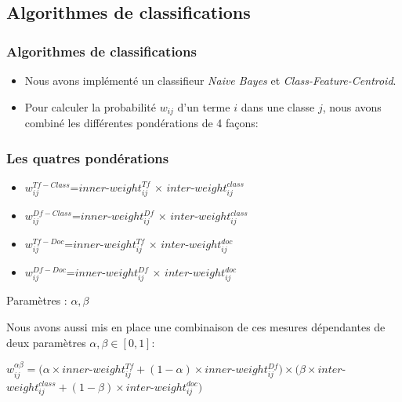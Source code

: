 \documentclass[12pt]{beamer}
\begin{document}
\subsection{Algorithmes de classifications}
\begin{frame}
\frametitle{Algorithmes de classifications}

\begin{itemize}
\item Nous avons implémenté un classifieur \textit{Naive Bayes} et \textit{Class-Feature-Centroid}. 
\item Pour calculer la probabilité $w_{ij}$ d'un terme $i$ dans une classe $j$, nous avons combiné les différentes pondérations de 4 façons:
\end{itemize}

\end{frame}
\begin{frame}
\frametitle{Les quatres pondérations}

\begin{itemize}
\item $w_{ij}^{Tf-Class}$=$inner$-$weight_{ij}^{Tf}$ $\times$ $inter$-$weight_{ij}^{class}$
\item $w_{ij}^{Df-Class}$=$inner$-$weight_{ij}^{Df}$ $\times$ $inter$-$weight_{ij}^{class}$
\item $w_{ij}^{Tf-Doc}$=$inner$-$weight_{ij}^{Tf}$ $\times$ $inter$-$weight_{ij}^{doc}$
\item $w_{ij}^{Df-Doc}$=$inner$-$weight_{ij}^{Df}$ $\times$ $inter$-$weight_{ij}^{doc}$
\end{itemize}
\begin{block}{Paramètres : $\alpha,\beta$}


Nous avons aussi mis en place une combinaison de ces mesures dépendantes de deux paramètres $\alpha,\beta \in [0,1]$:
\begin{center}
 $w_{ij}^{ \alpha \beta}=(\alpha \times inner$-$weight_{ij}^{Tf} + (1-\alpha)\times inner$-$weight_{ij}^{Df} )\times(\beta \times inter$-$weight_{ij}^{class} + (1-\beta) \times inter$-$weight_{ij}^{doc} )$
\end{center}
\end{block}
\end{frame}
\end{document}
